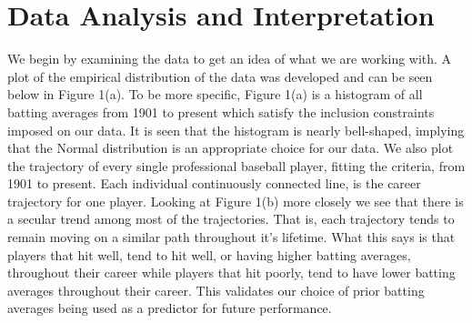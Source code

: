 \documentclass[10pt,a4paper]{article}
\begin{document}
\section*{\large Data Analysis and Interpretation}
We begin by examining the data to get an idea of what we are working with. A plot of the empirical distribution of the data was developed and can be seen below in Figure 1(a). To be more specific, Figure 1(a) is a histogram of all batting averages from 1901 to present which satisfy the inclusion constraints imposed on our data. It is seen that the histogram is nearly bell-shaped, implying that the Normal distribution is an appropriate choice for our data. We also plot the trajectory of every single professional baseball player, fitting the criteria, from 1901 to present. Each individual continuously connected line, is the career trajectory for one player. Looking at Figure 1(b) more closely we see that there is a secular trend among most of the trajectories. That is, each trajectory tends to remain moving on a similar path throughout it's lifetime. What this says is that players that hit well, tend to hit well, or having higher batting averages, throughout their career while players that hit poorly, tend to have lower batting averages throughout their career. This validates our choice of prior batting averages being used as a predictor for future performance.
\end{document}
